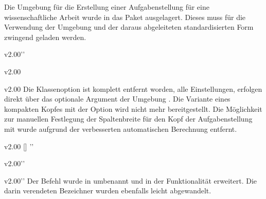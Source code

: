\minisec{\taskname}
%
\begin{Entity}{}
Die Umgebung für die Erstellung einer Aufgabenstellung für eine 
wissenschaftliche Arbeit wurde in das Paket  
ausgelagert. Dieses muss für die Verwendung der Umgebung  
und der daraus abgeleiteten standardisierten Form zwingend geladen werden.

\begin{Obsolete}{v2.00}{}''
\begin{Obsolete}{v2.00}{}
\begin{Obsolete}{v2.00}{}
\printdeclarationlist%
%
Die Klassenoption  ist komplett entfernt worden, alle 
Einstellungen, erfolgen direkt über das optionale Argument der Umgebung 
. Die Variante eines kompakten Kopfes mit der Option 
 wird nicht mehr bereitgestellt. Die Möglichkeit zur 
manuellen Festlegung der Spaltenbreite für den Kopf der Aufgabenstellung mit 
 wurde aufgrund der verbesserten automatischen Berechnung 
entfernt.
\end{Obsolete}
\end{Obsolete}
\end{Obsolete}

\begin{Obsolete}{v2.00}{%
  []%
}''
\begin{Obsolete}{v2.00}{}''
\begin{Obsolete}{v2.00}{}''
\printdeclarationlist%
%
Der Befehl  wurde in  umbenannt und in der 
Funktionalität erweitert. Die darin verendeten Bezeichner wurden ebenfalls 
leicht abgewandelt.
\end{Obsolete}
\end{Obsolete}
\end{Obsolete}


\end{Entity}
